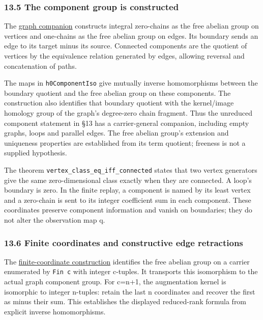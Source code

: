 \documentclass[
  11pt,
]{article}
\begin{document}
\subsubsection{13.5 The component group is
constructed}\label{the-component-group-is-constructed}

The \href{lean4/GraphHomology.lean}{graph companion} constructs integral
zero-chains as the free abelian group on vertices and one-chains as the
free abelian group on edges. Its boundary sends an edge to its target
minus its source. Connected components are the quotient of vertices by
the equivalence relation generated by edges, allowing reversal and
concatenation of paths.

The maps in \nolinkurl{h0ComponentIso} give mutually inverse homomorphisms
between the boundary quotient and the free abelian group on these
components. The construction also identifies that boundary quotient with
the kernel/image homology group of the graph's degree-zero chain
fragment. Thus the unreduced component statement in §13 has a
carrier-general companion, including empty graphs, loops and parallel
edges. The free abelian group's extension and uniqueness properties are
established from its term quotient; freeness is not a supplied
hypothesis.

The theorem \nolinkurl{vertex_class_eq_iff_connected} states that two
vertex generators give the same zero-dimensional class exactly when they
are connected. A loop's boundary is zero. In the finite replay, a
component is named by its least vertex and a zero-chain is sent to its
integer coefficient sum in each component. These coordinates preserve
component information and vanish on boundaries; they do not alter the
observation map q.

\subsubsection{13.6 Finite coordinates and constructive edge
retractions}\label{finite-coordinates-and-constructive-edge-retractions}

The \href{lean4/FiniteCoordinates.lean}{finite-coordinate construction}
identifies the free abelian group on a carrier enumerated by
\texttt{Fin\ c} with integer c-tuples. It transports this isomorphism to
the actual graph component group. For c=n+1, the augmentation kernel is
isomorphic to integer n-tuples: retain the last n coordinates and
recover the first as minus their sum. This establishes the displayed
reduced-rank formula from explicit inverse homomorphisms.
\end{document}
